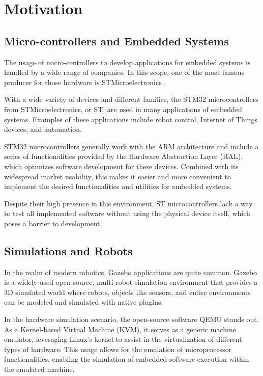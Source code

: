 \documentclass[../../monografia.tex]{subfiles}
\begin{document}
\section{Motivation}

\subsection{Micro-controllers and Embedded Systems}

The usage of micro-controllers to develop applications for embedded systems is handled by a wide range of companies. In this scope, one of the most famous producer for those hardware is STMicroelectronics \cite{STMicroelectronics_23}.

With a wide variety of devices and different families, the STM32 microcontrollers from STMicroelectronics, or ST, are used in many applications of embedded systems. Examples of these applications include robot control, Internet of Things devices, and automation.

STM32 microcontrollers generally work with the ARM architecture and include a series of functionalities provided by the Hardware Abstraction Layer (HAL), which optimizes software development for these devices. Combined with its widespread market usability, this makes it easier and more convenient to implement the desired functionalities and utilities for embedded systems.

Despite their high presence in this environment, ST microcontrollers lack a way to test all implemented software without using the physical device itself, which poses a barrier to development.

\subsection{Simulations and Robots}

In the realm of modern robotics, Gazebo applications are quite common. Gazebo \cite{gazebo_21} is a widely used open-source, multi-robot simulation environment that provides a 3D simulated world where robots, objects like sensors, and entire environments can be modeled and simulated with native plugins.

In the hardware simulation scenario, the open-source software QEMU \cite{QEMU_website_24} stands out. As a Kernel-based Virtual Machine (KVM), it serves as a generic machine emulator, leveraging Linux’s kernel to assist in the virtualization of different types of hardware. This usage allows for the emulation of microprocessor functionalities, enabling the simulation of embedded software execution within the emulated machine.
\end{document}
